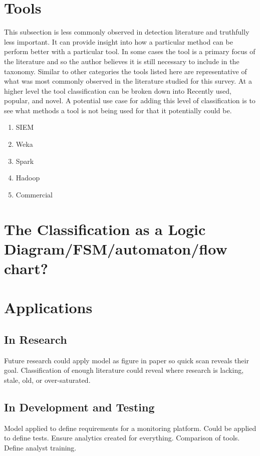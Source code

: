 \documentclass[conference]{IEEEtran}
\begin{document}
\section{Tools}
This subsection is less commonly observed in detection literature and truthfully less important. It can provide insight into how a particular method can be perform better with a particular tool. In some cases the tool is a primary focus of the literature and so the author believes it is still necessary to include in the taxonomy. Similar to other categories the tools listed here are representative of what was most commonly observed in the literature studied for this survey. At a higher level the tool classification can be broken down into Recently used, popular, and novel. A potential use case for adding this level of classification is to see what methods a tool is not being used for that it potentially could be.
\begin{enumerate}
    \item SIEM \cite{kotenko2012attack}
    \item Weka \cite{asif2011filtering}\cite{thevar2017effect}
    \item Spark \cite{gupta2016framework}\cite{dobson2018performance}
    \item Hadoop \cite{gupta2014big}\cite{tankard2012big}
    \item Commercial 
\end{enumerate}

\section{The Classification as a Logic Diagram/FSM/automaton/flow chart?}
\section{Applications}
\subsection{In Research}
Future research could apply model as figure in paper so quick scan reveals their goal. Classification of enough literature could reveal where research is lacking, stale, old, or over-saturated. 
\subsection{In Development and Testing}
Model applied to define requirements for a monitoring platform. Could be applied to define tests. Ensure analytics created for everything. Comparison of tools. Define analyst training.
\end{document}
